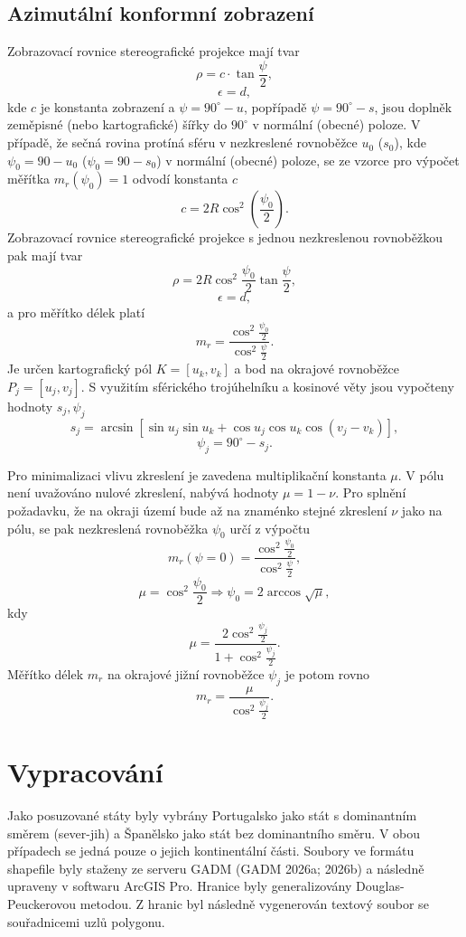\documentclass[12pt]{article}
\begin{document}
\subsection{Azimutální konformní zobrazení}
Zobrazovací rovnice stereografické projekce mají tvar
\[
\rho = c \cdot \tan \frac{\psi}{2},
\]
\[
\epsilon = d,
\]
kde $c$ je konstanta zobrazení a $\psi = 90^\circ - u$, popřípadě $\psi = 90^\circ - s$, jsou doplněk zeměpisné (nebo kartografické) šířky do $90^\circ$ v normální (obecné) poloze. V případě, že sečná rovina protíná sféru v nezkreslené rovnoběžce $u_0$ ($s_0$), kde $\psi_0 = 90 - u_0$ ($\psi_0 = 90 - s_0$) v normální (obecné) poloze, se ze vzorce pro výpočet měřítka $m_r(\psi_0) = 1$ odvodí konstanta $c$
\[
c = 2R \cos^2 \left(\frac{\psi_0}{2}\right).
\]
Zobrazovací rovnice stereografické projekce s jednou nezkreslenou rovnoběžkou pak mají tvar
\[
\rho = 2R \cos^2 \frac{\psi_0}{2} \tan \frac{\psi}{2},
\]
\[
\epsilon = d,
\]
a pro měřítko délek platí
\[
m_r = \frac{\cos^2 \frac{\psi_0}{2}}{\cos^2 \frac{\psi}{2}}.
\]
Je určen kartografický pól $K = [u_k, v_k]$ a bod na okrajové rovnoběžce $P_j = [u_j, v_j]$. S využitím sférického trojúhelníku a kosinové věty jsou vypočteny hodnoty $s_j, \psi_j$
\[
s_j = \arcsin \left[ \sin u_j \sin u_k + \cos u_j \cos u_k \cos(v_j - v_k) \right],
\]
\[
\psi_j = 90^\circ - s_j.
\]

Pro minimalizaci vlivu zkreslení je zavedena multiplikační konstanta $\mu$. V pólu není uvažováno nulové zkreslení, nabývá hodnoty $\mu = 1 - \nu$. Pro splnění požadavku, že na okraji území bude až na znaménko stejné zkreslení $\nu$ jako na pólu, se pak nezkreslená rovnoběžka $\psi_0$ určí z výpočtu
\[
m_r(\psi = 0) = \frac{\cos^2 \frac{\psi_0}{2}}{\cos^2 \frac{\psi}{2}},
\]
\[
\mu = \cos^2 \frac{\psi_0}{2} \Rightarrow \psi_0 = 2 \arccos \sqrt{\mu},
\]
kdy
\[
\mu = \frac{2 \cos^2 \frac{\psi_j}{2}}{1 + \cos^2 \frac{\psi_j}{2}}.
\]
Měřítko délek $m_r$ na okrajové jižní rovnoběžce $\psi_j$ je potom rovno
\[
m_r = \frac{\mu}{\cos^2 \frac{\psi_j}{2}}.
\]
\newpage
\section{Vypracování}
Jako posuzované státy byly vybrány Portugalsko jako stát s dominantním směrem (sever-jih) a Španělsko jako stát bez dominantního směru. V obou případech se jedná pouze o jejich kontinentální části. Soubory ve formátu shapefile byly staženy ze serveru GADM (GADM 2026a; 2026b) a následně upraveny v softwaru ArcGIS Pro. Hranice byly generalizovány Douglas-Peuckerovou metodou. Z hranic byl následně vygenerován textový soubor se souřadnicemi uzlů polygonu.
\end{document}
